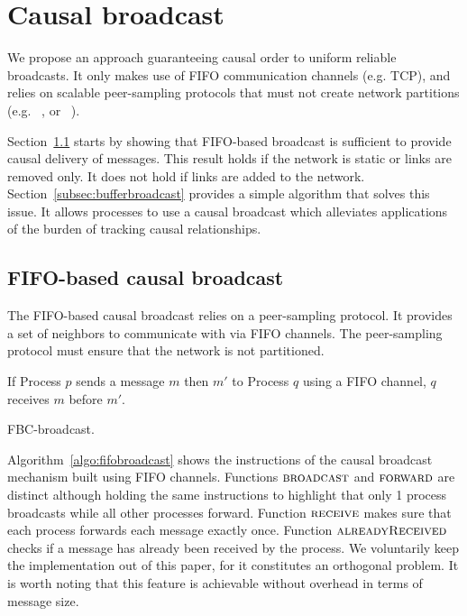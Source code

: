 
\section{Causal broadcast}
\label{sec:proposal}

We propose an approach guaranteeing causal order to uniform reliable
broadcasts. It only makes use of FIFO communication channels (e.g. TCP), and
relies on scalable peer-sampling protocols that must not create network
partitions (e.g. \SPRAY~\cite{nedelec2017adaptive}, or
\CYCLON~\cite{voulgaris2005cyclon}).

Section~\ref{subsec:fifobroadcast} starts by showing that FIFO-based broadcast
is sufficient to provide causal delivery of messages. This result holds if the
network is static or links are removed only. It does not hold if links are added
to the network. Section~\ref{subsec:bufferbroadcast} provides a simple algorithm
that solves this issue. It allows processes to use a causal broadcast which
alleviates applications of the burden of tracking causal relationships.

\subsection{FIFO-based causal broadcast}
\label{subsec:fifobroadcast}

The FIFO-based causal broadcast relies on a peer-sampling protocol. It provides
a set of neighbors to communicate with via FIFO channels. The peer-sampling
protocol must ensure that the network is not partitioned.

\begin{definition}
  If Process $p$ sends a message $m$ then $m'$ to Process $q$ using a FIFO
  channel, $q$ receives $m$ before $m'$.
\end{definition}

\begin{algorithm}[h]
  
  \caption{\label{algo:fifobroadcast}FBC-broadcast.}
\end{algorithm}

Algorithm~\ref{algo:fifobroadcast} shows the instructions of the causal
broadcast mechanism built using FIFO channels. Functions $\textsc{broadcast}$
and $\textsc{forward}$ are distinct although holding the same instructions to
highlight that only 1 process broadcasts while all other processes
forward. Function $\textsc{receive}$ makes sure that each process forwards each
message exactly once. Function $\textsc{alreadyReceived}$ checks if a message
has already been received by the process. We voluntarily keep the implementation
out of this paper, for it constitutes an orthogonal problem. It is worth noting
that this feature is achievable without overhead in terms of message size.

